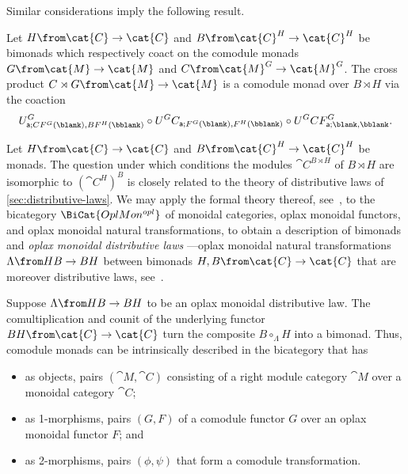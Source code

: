 Similar considerations imply the following result.

\begin{lemma}\label{lem: cross_product_of_bi/comonads_is_bi/comonad}
  Let \(H \from \cat{C} \to \cat{C}\) and \(B \from \cat{C}^H \to \cat{C}^H\)
  be bimonads which respectively coact on the comodule monads
  \(G \from \cat{M} \to \cat{M}\) and \(C \from \cat{M}^G \to \cat{M}^G\).
  The cross product \(C \rtimes G \from \cat{M} \to \cat{M}\)
  is a comodule monad over \(B \rtimes H\) via the coaction
  \[
    U^G_{\mathsf{a}; C F^G(\blank), B F^H(\bblank)} \circ U^G C_{\mathsf{a}; F^G(\blank), F^H(\bblank)} \circ U^G C F^G_{\mathsf{a}; \blank, \bblank}.
  \]
\end{lemma}

\begin{remark}
  Let \(H \from \cat{C} \to \cat{C}\) and \(B \from \cat{C}^H \to \cat{C}^H\) be monads.
  The question under which conditions
  the modules \(\cat{C}^{B\rtimes H}\) of \(B\rtimes H\) are isomorphic to \({(\cat{C}^H)}^B\)
  is closely related to the theory of distributive laws of \cref{sec:distributive-laws}.
  We may apply the formal theory thereof, see~\cite{Street1972},
  to the bicategory \(\BiCat{OplMon^{opl}}\) of
  monoidal categories,
  oplax monoidal functors,
  and oplax monoidal natural transformations,
  to obtain a description of bimonads and \emph{oplax monoidal distributive laws}%
  —oplax monoidal natural transformations \(\Lambda \from HB \to BH\) between
  bimonads \(H, B \from \cat{C} \to \cat{C}\)
  that are moreover distributive laws, see~\cite{McCrudden2002}.

  Suppose \(\Lambda \from HB \to BH\) to be an oplax monoidal distributive law.
  The comultiplication and counit of the underlying functor
  \(BH \from \cat{C} \to \cat{C}\) turn the composite \(B \circ_{\Lambda} H\) into a bimonad.
  Thus, comodule monads can be intrinsically described in the bicategory that has
  \begin{itemize}[noitemsep]
    \item as objects, pairs \((\cat{M}, \cat{C})\)
    consisting of a right module category \(\cat{M}\) over a monoidal category \(\cat{C}\);
    \item as 1-morphisms, pairs \((G, F)\)
    of a comodule functor \(G\) over an oplax monoidal functor \(F\); and
    \item as 2-morphisms, pairs \((\phi, \psi)\)
    that form a comodule transformation.
  \end{itemize}
\end{remark}

